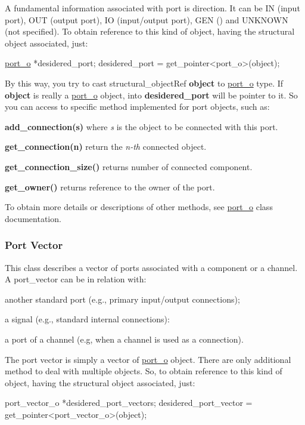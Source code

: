 A fundamental information associated with port is direction. It can be IN (input port), O\+UT (output port), IO (input/output port), G\+EN () and U\+N\+K\+N\+O\+WN (not specified). To obtain reference to this kind of object, having the structural object associated, just\+: 
\begin{DoxyCode}
\hyperlink{structport__o}{port\_o} *desidered\_port;
desidered\_port = get\_pointer<port\_o>(object);
\end{DoxyCode}
 By this way, you try to cast structural\+\_\+object\+Ref {\bfseries object} to \hyperlink{structport__o}{port\+\_\+o} type. If {\bfseries object} is really a \hyperlink{structport__o}{port\+\_\+o} object, into {\bfseries desidered\+\_\+port} will be pointer to it. So you can access to specific method implemented for port objects, such as\+:
\begin{DoxyItemize}
\item {\bfseries add\+\_\+connection(s)} where {\itshape s} is the object to be connected with this port.
\item {\bfseries get\+\_\+connection(n)} return the {\itshape n-\/th} connected object.
\item {\bfseries get\+\_\+connection\+\_\+size()} returns number of connected component.
\item {\bfseries get\+\_\+owner()} returns reference to the owner of the port.
\end{DoxyItemize}

To obtain more details or descriptions of other methods, see \hyperlink{structport__o}{port\+\_\+o} class documentation.\hypertarget{src_circuit_page_s_o_portvector}{}\subsubsection{Port Vector}\label{src_circuit_page_s_o_portvector}
This class describes a vector of ports associated with a component or a channel. A port\+\_\+vector can be in relation with\+:
\begin{DoxyItemize}
\item another standard port (e.\+g., primary input/output connections);
\item a signal (e.\+g., standard internal connections)\+:
\item a port of a channel (e.\+g, when a channel is used as a connection).
\end{DoxyItemize}

The port vector is simply a vector of \hyperlink{structport__o}{port\+\_\+o} object. There are only additional method to deal with multiple objects. So, to obtain reference to this kind of object, having the structural object associated, just\+: 
\begin{DoxyCode}
port\_vector\_o *desidered\_port\_vectors;
desidered\_port\_vector = get\_pointer<port\_vector\_o>(object);
\end{DoxyCode}


